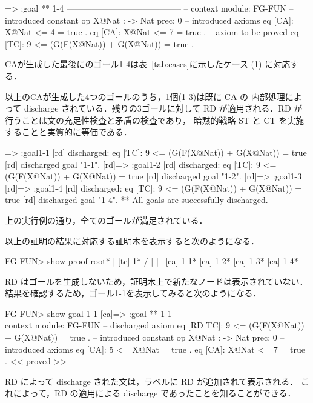 \documentclass[a4paper,oneside,10pt,here]{memoir}
\newenvironment{vvtm}%
{\parskip=0pt\lineskip=0pt\begin{center}\begin{minipage}{0.8\textwidth}\begin{snugshade}}%
  {\end{snugshade}\end{minipage}\end{center}}
\begin{document}
\begin{vvtm}
  \begin{simplev}
[ca]=>
:goal { ** 1-4 -----------------------------------------
  -- context module: FG-FUN
  -- introduced constant
    op X@Nat : -> Nat { prec: 0 }
  -- introduced axioms
    eq [CA]: X@Nat <= 4 = true .
    eq [CA]: X@Nat <= 7 = true .
  -- axiom to be proved
    eq [TC]: 9 <= (G(F(X@Nat)) + G(X@Nat))
        = true .
}
\end{simplev}
\end{vvtm}
CAが生成した最後にのゴール1-4は表~\ref{tab:cases}に示したケース
(1) に対応する．

以上のCAが生成した4つのゴールのうち，1個(1-3)は既に CA の
内部処理によって discharge されている．残りの3ゴールに対して
RD が適用される．RD が行うことは文の充足性検査と矛盾の検査であり，
暗黙的戦略 ST と CT を実施することと実質的に等価である．

\begin{vvtm}
\begin{simplev}
[rd]=> :goal{1-1}
[rd] discharged: 
  eq [TC]: 9 <= (G(F(X@Nat)) + G(X@Nat))
      = true
[rd] discharged goal "1-1".
[rd]=> :goal{1-2}
[rd] discharged: 
  eq [TC]: 9 <= (G(F(X@Nat)) + G(X@Nat))
      = true
[rd] discharged goal "1-2".
[rd]=> :goal{1-3}
[rd]=> :goal{1-4}
[rd] discharged: 
  eq [TC]: 9 <= (G(F(X@Nat)) + G(X@Nat))
      = true
[rd] discharged goal "1-4".
** All goals are successfully discharged.
  \end{simplev}
\end{vvtm}

上の実行例の通り，全てのゴールが満足されている．

以上の証明の結果に対応する証明木を表示すると次のようになる．
\begin{vvtm}
  \begin{simplev}
FG-FUN> show proof
                  root*                   
                    |                      
                 [tc] 1*                  
    /          |          |          \     
[ca] 1-1*  [ca] 1-2*  [ca] 1-3*  [ca] 1-4*
  \end{simplev}
\end{vvtm}
RD はゴールを生成しないため，証明木上で新たなノードは表示されていない．
結果を確認するため，ゴール1-1を表示してみると次のようになる．
\begin{vvtm}
  \begin{simplev}
FG-FUN> show goal 1-1
[ca]=>
:goal { ** 1-1 -----------------------------------------
  -- context module: FG-FUN
  -- discharged axiom
    eq [RD TC]: 9 <= (G(F(X@Nat)) + G(X@Nat))
        = true .
  -- introduced constant
    op X@Nat : -> Nat { prec: 0 }
  -- introduced axioms
    eq [CA]: 5 <= X@Nat = true .
    eq [CA]: X@Nat <= 7 = true .
} << proved >>
  \end{simplev}
\end{vvtm}
RD によって discharge された文は，ラベルに RD が追加されて表示される．
これによって，RD の適用による discharge であったことを知ることができる．



\end{document}
